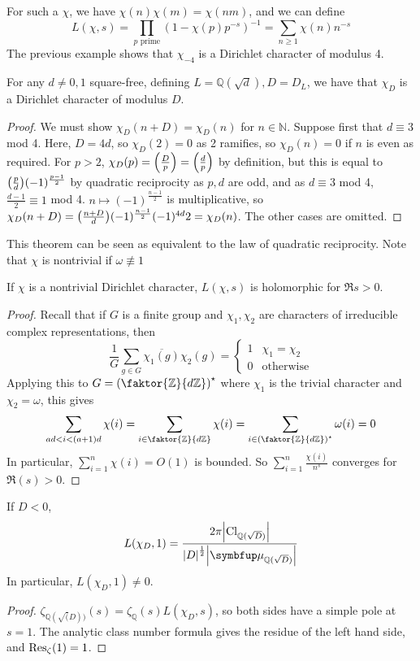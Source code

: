 For such a \( \chi \), we have \( \chi(n)\chi(m) = \chi(nm) \), and we can define
\[ L(\chi,s) = \prod_{p \text{ prime}}(1 - \chi(p)p^{-s})^{-1} = \sum_{n \geq 1}\chi(n)n^{-s} \]
The previous example shows that \( \chi_{-4} \) is a Dirichlet character of modulus 4.
\begin{theorem}
    For any \( d \neq 0, 1 \) square-free, defining \( L = \mathbb Q(\sqrt{d}), D = D_L \), we have that \( \chi_D \) is a Dirichlet character of modulus \( D \).
\end{theorem}
\begin{proof}
    We must show \( \chi_D(n+D) = \chi_D(n) \) for \( n \in \mathbb N \).
    Suppose first that \( d \equiv 3 \) mod 4.
    Here, \( D = 4d \), so \( \chi_D(2) = 0 \) as 2 ramifies, so \( \chi_D(n) = 0 \) if \( n \) is even as required.
    For \( p > 2 \), \( \chi_D(p) = \qty(\frac{D}{p}) = \qty(\frac{d}{p}) \) by definition, but this is equal to \( \qty(\frac{p}{d}) (-1)^{\frac{p-1}{2}} \) by quadratic reciprocity as \( p, d \) are odd, and as \( d \equiv 3 \) mod 4, \( \frac{d-1}{2} \equiv 1 \) mod 4.
    \( n \mapsto (-1)^{\frac{n-1}{2}} \) is multiplicative, so \( \chi_D(n+D) = \qty(\frac{n+D}{d})(-1)^{\frac{n-1}{2}}(-1)^{4d}{2} = \chi_D(n) \).
    The other cases are omitted.
\end{proof}
This theorem can be seen as equivalent to the law of quadratic reciprocity.
Note that \( \chi \) is nontrivial if \( \omega \not\equiv 1 \)
\begin{lemma}
    If \( \chi \) is a nontrivial Dirichlet character, \( L(\chi, s) \) is holomorphic for \( \Re s > 0 \).
\end{lemma}
\begin{proof}
    Recall that if \( G \) is a finite group and \( \chi_1, \chi_2 \) are characters of irreducible complex representations, then
    \[ \frac{1}{G} \sum_{g \in G} \overline{\chi_1(g)} \chi_2(g) = \begin{cases}
        1 & \chi_1 = \chi_2 \\
        0 & \text{otherwise}
    \end{cases} \]
    Applying this to \( G = \qty(\faktor{\mathbb Z}{d\mathbb Z})^\star \) where \( \chi_1 \) is the trivial character and \( \chi_2 = \omega \), this gives
    \[ \sum_{ad < i < (a+1)d} \chi(i) = \sum_{i \in \faktor{\mathbb Z}{d\mathbb Z}} \chi(i) = \sum_{i \in \qty(\faktor{\mathbb Z}{d\mathbb Z})^\star} \omega(i) = 0 \]
    In particular, \( \sum_{i=1}^n \chi(i) = O(1) \) is bounded.
    So \( \sum_{i=1}^n \frac{\chi(i)}{n^s} \) converges for \( \Re(s) > 0 \).
\end{proof}
\begin{corollary}
    If \( D < 0 \),
    \[ L(\chi_D, 1) = \frac{2\pi \abs{\mathrm{Cl}_{\mathbb Q(\sqrt{D})}}}{\abs{D}^{\frac{1}{2}} \abs{\bm\mu_{\mathbb Q(\sqrt{D})}}} \]
    In particular, \( L(\chi_D, 1) \neq 0 \).
\end{corollary}
\begin{proof}
    \( \zeta_{\mathbb Q(\sqrt(D))}(s) = \zeta_{\mathbb Q}(s)L(\chi_D, s) \), so both sides have a simple pole at \( s = 1 \).
    The analytic class number formula gives the residue of the left hand side, and \( \Res_\zeta(1) = 1 \).
\end{proof}

